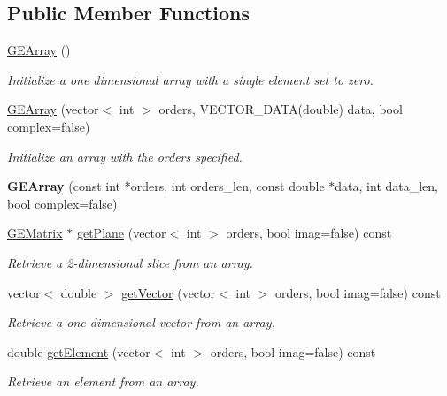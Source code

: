 \subsection*{Public Member Functions}
\begin{DoxyCompactItemize}
\item 
\mbox{\label{class_g_e_array_a59934816e881cf01fb22d08f1d8fc1e0}} 
\hyperlink{class_g_e_array_a59934816e881cf01fb22d08f1d8fc1e0}{G\+E\+Array} ()
\begin{DoxyCompactList}\small\item\em Initialize a one dimensional array with a single element set to zero. \end{DoxyCompactList}\item 
\hyperlink{class_g_e_array_a99e59c84b9ee6288030cda2fecc116af}{G\+E\+Array} (vector$<$ int $>$ orders, V\+E\+C\+T\+O\+R\+\_\+\+D\+A\+TA(double) data, bool complex=false)
\begin{DoxyCompactList}\small\item\em Initialize an array with the orders specified. \end{DoxyCompactList}\item 
\mbox{\label{class_g_e_array_aff83dc2b4d74f050eff84e360a8df3c9}} 
{\bfseries G\+E\+Array} (const int $\ast$orders, int orders\+\_\+len, const double $\ast$data, int data\+\_\+len, bool complex=false)
\item 
\hyperlink{class_g_e_matrix}{G\+E\+Matrix} $\ast$ \hyperlink{class_g_e_array_ac230d6d9b825fb9a6c0dd64444268daf}{get\+Plane} (vector$<$ int $>$ orders, bool imag=false) const
\begin{DoxyCompactList}\small\item\em Retrieve a 2-\/dimensional slice from an array. \end{DoxyCompactList}\item 
vector$<$ double $>$ \hyperlink{class_g_e_array_a2342cd028aa64d75cea4492b8458a6b6}{get\+Vector} (vector$<$ int $>$ orders, bool imag=false) const
\begin{DoxyCompactList}\small\item\em Retrieve a one dimensional vector from an array. \end{DoxyCompactList}\item 
double \hyperlink{class_g_e_array_a48fc60569350f3522f3bd6d074bd92ec}{get\+Element} (vector$<$ int $>$ orders, bool imag=false) const
\begin{DoxyCompactList}\small\item\em Retrieve an element from an array. \end{DoxyCompactList}\item 

\end{DoxyCompactItemize}
